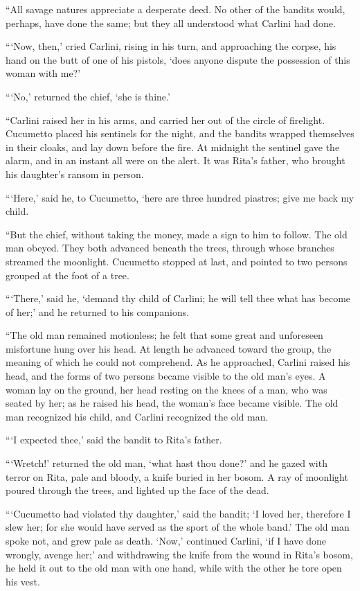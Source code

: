“All savage natures appreciate a desperate deed. No other of the
bandits would, perhaps, have done the same; but they all understood
what Carlini had done.

“‘Now, then,’ cried Carlini, rising in his turn, and approaching the
corpse, his hand on the butt of one of his pistols, ‘does anyone
dispute the possession of this woman with me?’

“‘No,’ returned the chief, ‘she is thine.’

“Carlini raised her in his arms, and carried her out of the circle of
firelight. Cucumetto placed his sentinels for the night, and the
bandits wrapped themselves in their cloaks, and lay down before the
fire. At midnight the sentinel gave the alarm, and in an instant all
were on the alert. It was Rita’s father, who brought his daughter’s
ransom in person.

“‘Here,’ said he, to Cucumetto, ‘here are three hundred piastres; give
me back my child.

“But the chief, without taking the money, made a sign to him to follow.
The old man obeyed. They both advanced beneath the trees, through whose
branches streamed the moonlight. Cucumetto stopped at last, and pointed
to two persons grouped at the foot of a tree.

“‘There,’ said he, ‘demand thy child of Carlini; he will tell thee what
has become of her;’ and he returned to his companions.

“The old man remained motionless; he felt that some great and
unforeseen misfortune hung over his head. At length he advanced toward
the group, the meaning of which he could not comprehend. As he
approached, Carlini raised his head, and the forms of two persons
became visible to the old man’s eyes. A woman lay on the ground, her
head resting on the knees of a man, who was seated by her; as he raised
his head, the woman’s face became visible. The old man recognized his
child, and Carlini recognized the old man.

“‘I expected thee,’ said the bandit to Rita’s father.

“‘Wretch!’ returned the old man, ‘what hast thou done?’ and he gazed
with terror on Rita, pale and bloody, a knife buried in her bosom. A
ray of moonlight poured through the trees, and lighted up the face of
the dead.

“‘Cucumetto had violated thy daughter,’ said the bandit; ‘I loved her,
therefore I slew her; for she would have served as the sport of the
whole band.’ The old man spoke not, and grew pale as death. ‘Now,’
continued Carlini, ‘if I have done wrongly, avenge her;’ and
withdrawing the knife from the wound in Rita’s bosom, he held it out to
the old man with one hand, while with the other he tore open his vest.

